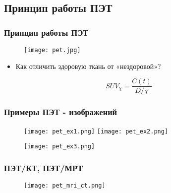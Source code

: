 \subsection{Принцип работы ПЭТ}
\begin{frame}
    \frametitle{Принцип работы ПЭТ}
    \begin{figure}
        \texttt{[image: pet.jpg]}
    \end{figure}

    \begin{itemize}
        \item Как отличить здоровую ткань от «нездоровой»?
    \end{itemize}
    \[SUV_{\chi}=\frac{C(t)}{D/\chi}\]
\end{frame}


\begin{frame}
    \frametitle{Примеры ПЭТ - изображений}

    \begin{figure}[htbp]
        \texttt{[image: pet\_ex1.png]}
        \hfill
        \texttt{[image: pet\_ex2.png]}   
    \end{figure}

    \begin{figure}
        \texttt{[image: pet\_ex3.png]}
    \end{figure}
\end{frame}

\begin{frame}
    \frametitle{ПЭТ/КТ, ПЭТ/МРТ}
    \begin{figure}
        \texttt{[image: pet\_mri\_ct.png]}
    \end{figure}
\end{frame}